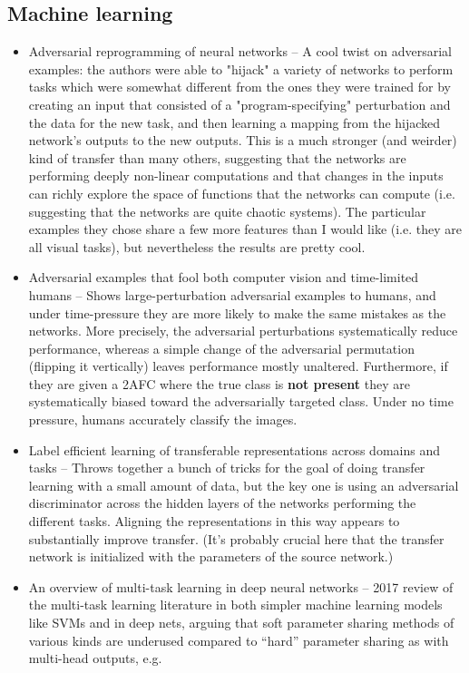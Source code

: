 \documentclass[10pt]{article}
\begin{document}
\subsection{Machine learning}
\begin{itemize}
\item Adversarial reprogramming of neural networks -- A cool twist on adversarial examples: the authors were able to "hijack" a variety of networks to perform tasks which were somewhat different from the ones they were trained for by creating an input that consisted of a "program-specifying" perturbation and the data for the new task, and then learning a mapping from the hijacked network's outputs to the new outputs. This is a much stronger (and weirder) kind of transfer than many others, suggesting that the networks are performing deeply non-linear computations and that changes in the inputs can richly explore the space of functions that the networks can compute (i.e. suggesting that the networks are quite chaotic systems). The particular examples they chose share a few more features than I would like (i.e. they are all visual tasks), but nevertheless the results are pretty cool. \citep{Elsayed2018}
\item Adversarial examples that fool both computer vision and time-limited humans -- Shows large-perturbation adversarial examples to humans, and under time-pressure they are more likely to make the same mistakes as the networks. More precisely, the adversarial perturbations systematically reduce performance, whereas a simple change of the adversarial permutation (flipping it vertically) leaves performance mostly unaltered. Furthermore, if they are given a 2AFC where the true class is \textbf{not present} they are systematically biased toward the adversarially targeted class. Under no time pressure, humans accurately classify the images.
\item Label efficient learning of transferable representations across domains and tasks -- Throws together a bunch of tricks for the goal of doing transfer learning with a small amount of data, but the key one is using an adversarial discriminator across the hidden layers of the networks performing the different tasks. Aligning the representations in this way appears to substantially improve transfer. (It's probably crucial here that the transfer network is initialized with the parameters of the source network.) \citep{Luo2017} 
\item An overview of multi-task learning in deep neural networks -- 2017 review of the multi-task learning literature in both simpler machine learning models like SVMs and in deep nets, arguing that soft parameter sharing methods of various kinds are underused compared to ``hard'' parameter sharing as with multi-head outputs, e.g.\citep{Ruder2017} 

\end{itemize}
\end{document}
